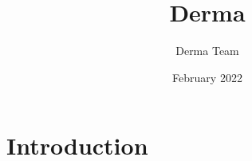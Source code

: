 \documentclass{article}
\title{Derma}
\author{Derma Team}
\date{February 2022}
\begin{document}
\maketitle

\section{Introduction}
\end{document}
